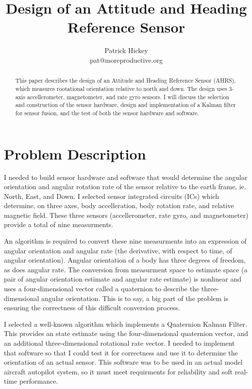 \documentclass[12pt]{report}
\begin{document}
%
\title{Design of an Attitude and Heading Reference Sensor}
\author{Patrick Hickey\\pat@moreproductive.org}


\begin{abstract}
This paper describes the design of an Attitude and Heading Reference Sensor (AHRS), which measures rootational orientation relative to north and down. 
The design uses 3-axis accellerometer, magnetometer, and rate gyro sensors. 
I will discuss the selection and construction of the sensor hardware, design and implementation of a Kalman filter for sensor fusion, and the test of both the sensor hardware and software.
\end{abstract}


\section{Problem Description}

I needed to build sensor hardware and software that would determine the angular orientation and angular rotation rate of the sensor relative to the earth frame, ie. North, East, and Down. I selected sensor integrated circuits (ICs) which determine, on three axes, body accelleration, body rotation rate, and relative magnetic field. These three sensors (accellerometer, rate gyro, and magnetometer) provide a total of nine measurments. 

An algorithm is required to convert these nine measurments into an expression of angular orientation and angular rate (the derivative, with respect to time, of angular orientation). Angular orientation of a body has three degrees of freedom, as does angular rate. The conversion from measurment space to estimate space (a pair of angular orientation estimate and angular rate estimate) is nonlinear and uses a four-dimensional vector called a quaternion to describe the three-dimensional angular orientation. This is to say, a big part of the problem is ensuring the correctness of this difficult conversion process.   

I selected a well-known algorithm which implements a Quaternion Kalman Filter. This provides an state estimate using the four-dimensional quaternion vector, and an additional three-dimensional rotational rate vector. I needed to implement that software so that I could test it for correctness and use it to determine the orientation of an actual sensor. This software was to be used in an actual model aircraft autopilot system, so it must meet requirments for reliability and soft real-time performance.
\end{document}
